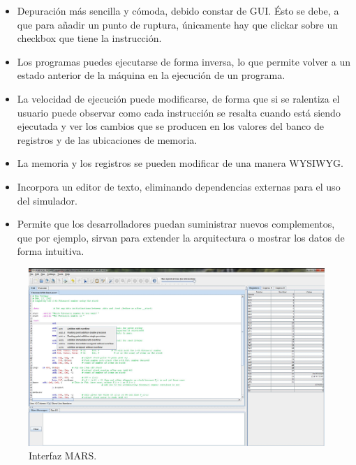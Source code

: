 \begin{itemize}

\item Depuración más sencilla y cómoda, debido constar de GUI. Ésto se debe, a que para añadir un punto de ruptura, únicamente hay que clickar sobre un checkbox que tiene la instrucción.

\item Los programas puedes ejecutarse de forma inversa, lo que permite volver a un estado anterior de la máquina en la ejecución de un programa.

\item La velocidad de ejecución puede modificarse, de forma que si se ralentiza el usuario puede observar como cada instrucción se resalta cuando está siendo ejecutada y ver los cambios que se producen en los valores del banco de registros y de las ubicaciones de memoria.

\item  La memoria y los registros se pueden modificar de una manera WYSIWYG.

\item Incorpora un editor de texto, eliminando dependencias externas para el uso del simulador.

\item Permite que los desarrolladores puedan suministrar nuevos complementos, que por ejemplo, sirvan para extender la arquitectura o mostrar los datos de forma intuitiva.

\end{itemize}

\begin{figure}[htbp]
 	\centering
 	\includegraphics[width=12cm]{figures/mars_figure}
 	\caption{Interfaz MARS.}
	\label{fig:qtspim_figure}
\end{figure}


